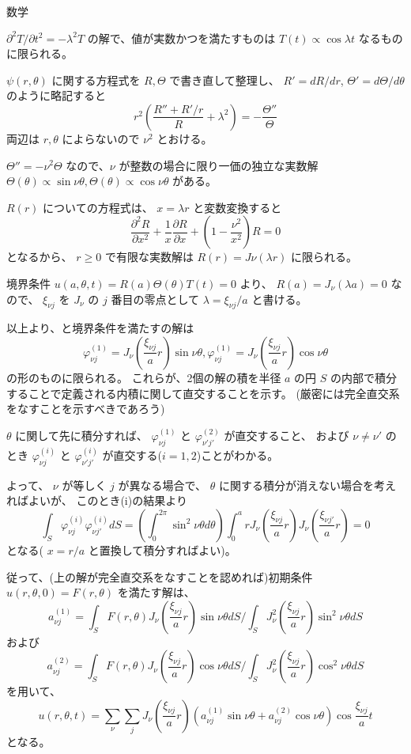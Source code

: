 \documentclass[fleqn]{jbook}
\begin{document}
\begin{answer}{数学}{}
\begin{enumerate}
$\partial^2T/\partial t^2 = -\lambda^2 T$ の解で、値が実数かつを満たすものは
$T(t)\propto \cos{\lambda t}$ なるものに限られる。

$\psi(r,\theta)$ に関する方程式を $R, \Theta$ で書き直して整理し、 $R'=dR/dr$, $\Theta'=d\Theta/d\theta$ 
のように略記すると
\[
r^2\left(\frac{R''+R'/r}{R}+\lambda^2\right)=-\frac{\Theta''}{\Theta}
\]
両辺は $r, \theta$ によらないので $\nu^2$ とおける。

$\Theta''=-\nu^2\Theta$ なので、$\nu$ が整数の場合に限り一価の独立な実数解
$\Theta(\theta) \propto \sin{\nu\theta}, \Theta(\theta) \propto \cos{\nu\theta}$ がある。

$R(r)$ についての方程式は、 $x=\lambda r$ と変数変換すると
\[
\frac{\partial^2 R}{\partial x^2}+\frac1x\frac{\partial R}{\partial x}+\left(1-\frac{\nu^2}{x^2}\right)R = 0
\]
となるから、 $r\geq 0$ で有限な実数解は $R(r)=J\nu(\lambda r)$ に限られる。

境界条件 $u(a,\theta,t) = R(a)\Theta(\theta)T(t) = 0$ より、 $R(a)=J_\nu(\lambda a)=0$ なので、
$\xi_{\nu j}$ を $J_\nu$ の $j$ 番目の零点として $\lambda = \xi_{\nu j}/a$ と書ける。

以上より、と境界条件を満たすの解は
\[
\varphi_{\nu j}^{(1)} = J_\nu\left(\frac{\xi_{\nu j}}a r\right)\sin{\nu\theta},
\varphi_{\nu j}^{(1)} = J_\nu\left(\frac{\xi_{\nu j}}a r\right)\cos{\nu\theta}
\]
の形のものに限られる。
これらが、2個の解の積を半径 $a$ の円 $S$ の内部で積分することで定義される内積に関して直交することを示す。
(厳密には完全直交系をなすことを示すべきであろう)

$\theta$ に関して先に積分すれば、 $\varphi_{\nu j}^{(1)}$ と $\varphi_{\nu' j'}^{(2)}$ が直交すること、
および $\nu\neq\nu'$ のとき $\varphi_{\nu j}^{(i)}$ と $\varphi_{\nu' j'}^{(i)}$ が直交する($i=1,2$)ことがわかる。

よって、 $\nu$ が等しく $j$ が異なる場合で、 $\theta$ に関する積分が消えない場合を考えればよいが、
このとき(i)の結果より
\[
\int_S \varphi_{\nu j}^{(i)}\varphi_{\nu j'}^{(i)}dS
= \left(\int_0^{2\pi}\sin^2\nu\theta d\theta\right)
\int_0^a r J_\nu\left(\frac{\xi_{\nu j}}a r\right)J_\nu\left(\frac{\xi_{\nu j'}}a r\right)
= 0
\]
となる( $x=r/a$ と置換して積分すればよい)。

従って、(上の解が完全直交系をなすことを認めれば)初期条件 $u(r,\theta,0) = F(r,\theta)$ を満たす解は、
\[
a_{\nu j}^{(1)} = \int_SF(r,\theta)J_\nu\left(\frac{\xi_{\nu j}}a r\right)\sin{\nu\theta}dS/
\int_SJ_\nu^2\left(\frac{\xi_{\nu j}}a r\right)\sin^2{\nu\theta}dS
\]
および
\[
a_{\nu j}^{(2)} = \int_SF(r,\theta)J_\nu\left(\frac{\xi_{\nu j}}a r\right)\cos{\nu\theta}dS/
\int_SJ_\nu^2\left(\frac{\xi_{\nu j}}a r\right)\cos^2{\nu\theta}dS
\]
を用いて、
\[
u(r,\theta,t) = \sum_\nu\sum_j
J_\nu\left(\frac{\xi_{\nu j}}a r\right)
\left(a_{\nu j}^{(1)}\sin{\nu\theta}+a_{\nu j}^{(2)}\cos{\nu\theta}\right)
\cos{\frac{\xi_{\nu j}}at}
\]
となる。


\end{enumerate}
\end{answer}
\end{document}
